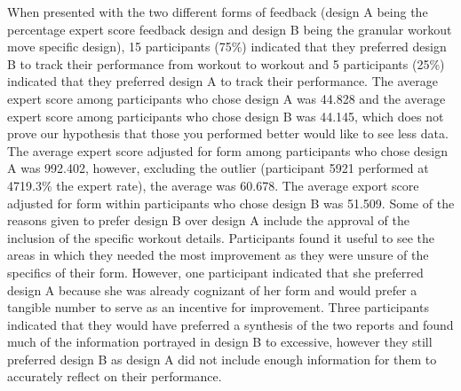 When presented with the two different forms of feedback (design A being the percentage expert score feedback design and design B being the granular workout move specific design),  15 participants (75\%) indicated that they preferred design B to track their performance from workout to workout and 5 participants (25\%) indicated that they preferred design A to track their performance.  The average expert score among participants who chose design A was 44.828 and the average expert score among participants who chose design B was 44.145, which does not prove our hypothesis that those you performed better would like to see less data.  The average expert score adjusted for form among participants who chose design A was 992.402, however, excluding the outlier (participant 5921 performed at 4719.3\% the expert rate), the average was 60.678.  The average export score adjusted for form within participants who chose design B was 51.509.  Some of the reasons given to prefer design B over design A include the approval of the inclusion of the specific workout details.  Participants found it useful to see the areas in which they needed the most improvement as they were unsure of the specifics of their form.  However, one participant indicated that she preferred design A because she was already cognizant of her form and would prefer a tangible number to serve as an incentive for improvement.  Three participants indicated that they would have preferred a synthesis of the two reports and found much of the information portrayed in design B to excessive, however they still preferred design B as design A did not include enough information for them to accurately reflect on their performance.

